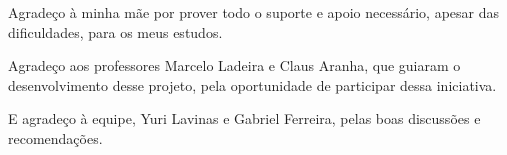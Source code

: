 Agradeço à minha mãe por prover todo o suporte e apoio necessário, apesar das dificuldades, para os meus estudos.

Agradeço aos professores Marcelo Ladeira e Claus Aranha, que guiaram o desenvolvimento desse projeto, pela oportunidade de participar dessa iniciativa.

E agradeço à equipe, Yuri Lavinas e Gabriel Ferreira, pelas boas discussões e recomendações.